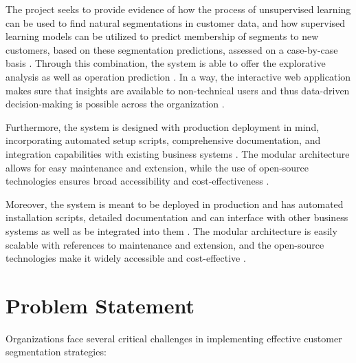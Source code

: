 \documentclass[12pt,a4paper]{report}
\begin{document}
\noindent
The project seeks to provide evidence of how the process of unsupervised learning can be used to find natural segmentations in customer data, and how supervised learning models can be utilized to predict membership of segments to new customers, based on these segmentation predictions, assessed on a case-by-case basis \cite{hastie2009}. Through this combination, the system is able to offer the explorative analysis as well as operation prediction \cite{han2011}. In a way, the interactive web application makes sure that insights are available to non-technical users and thus data-driven decision-making is possible across the organization \cite{few2009}.

\noindent
Furthermore, the system is designed with production deployment in mind, incorporating automated setup scripts, comprehensive documentation, and integration capabilities with existing business systems \cite{merkel2014}. The modular architecture allows for easy maintenance and extension, while the use of open-source technologies ensures broad accessibility and cost-effectiveness \cite{bass2012}.

\noindent
Moreover, the system is meant to be deployed in production and has automated installation scripts, detailed documentation and can interface with other business systems as well as be integrated into them \cite{merkel2014, humble2010}. The modular architecture is easily scalable with references to maintenance and extension, and the open-source technologies make it widely accessible and cost-effective \cite{wedel2000, gamma1994}.


\section{Problem Statement}
Organizations face several critical challenges in implementing effective customer segmentation strategies:
\end{document}
